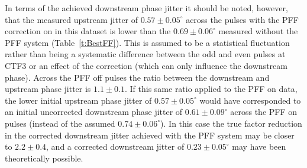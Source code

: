In terms of the achieved downstream phase jitter it should be noted, however, that the measured upstream jitter of \(0.57\pm0.05^\circ\) across the pulses with the PFF correction on in this dataset is lower than the \(0.69\pm0.06^\circ\) measured without the PFF system (Table~\ref{t:BestFF}). This is assumed to be a statistical fluctuation rather than being a systematic difference between the odd and even pulses at CTF3 or an effect of the correction (which can only influence the downstream phase). 
Across the PFF off pulses the ratio between the downstream and upstream phase jitter is \(1.1\pm0.1\). If this same ratio applied to the PFF on data, the lower initial upstream phase jitter of \(0.57\pm0.05^\circ\) would have corresponded to an initial uncorrected downstream phase jitter of \(0.61\pm0.09^\circ\) across the PFF on pulses (instead of the assumed \(0.74\pm0.06^\circ\)). In this case the true factor reduction in the corrected downstream jitter achieved with the PFF system may be closer to \(2.2\pm0.4\), and a corrected downstream jitter of \(0.23\pm0.05^\circ\) may have been theoretically possible. 

